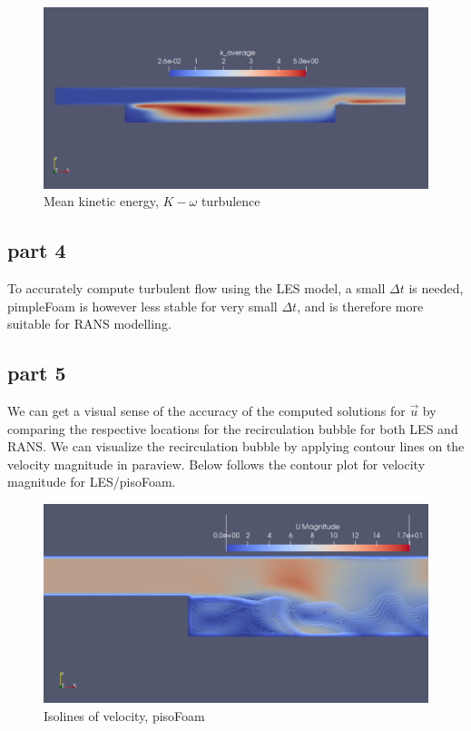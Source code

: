 \documentclass[paper=a4, fontsize=11pt]{article} %
\numberwithin{equation}{section} %
\numberwithin{figure}{section} %
\numberwithin{table}{section} %
\begin{document}
    \begin{figure}[H]
        \centering
        \includegraphics[width=0.6\linewidth]{Figures/simple_KOmega_K_mean}
        \caption{Mean kinetic energy, $K - \omega$ turbulence}
        \label{fig:MeanKKomega}
    \end{figure}
    \clearpage
    \subsection*{part 4}
    To accurately compute turbulent flow using the LES model, a small $\Delta t$ is needed, pimpleFoam is however less stable for very small $\Delta t$, and is therefore more suitable for RANS modelling.
    
    \subsection*{part 5}
    We can get a visual sense of the accuracy of the computed solutions for $\overrightarrow{u}$ by comparing the respective locations for the recirculation bubble for both LES and RANS. We can visualize the recirculation bubble by applying contour lines on the velocity magnitude in paraview. Below follows the contour plot for velocity magnitude for LES/pisoFoam.

    \begin{figure}[h]
        \centering
        \includegraphics[width=0.6\linewidth]{Figures/isolines_U_mag_pisoFoam_refined}
        \caption{Isolines of velocity, pisoFoam}
        \label{fig:IsoPiso}
    \end{figure}
    
\end{document}
